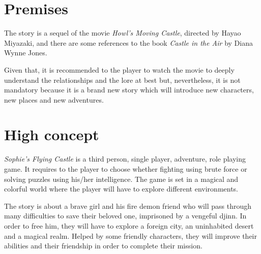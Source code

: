 \section{Premises}

The story is a sequel of the movie \textit{Howl’s Moving Castle}, directed by Hayao Miyazaki, and there are some references to the book \textit{Castle in the Air} by Diana Wynne Jones.

Given that, it is recommended to the player to watch the movie to deeply understand the relationships and the lore at best but, nevertheless, it is not mandatory because it is a brand new story which will introduce new characters, new places and new adventures.

{\let\clearpage\relax\section{High concept}}

\textit{Sophie's Flying Castle} is a third person, single player, adventure, role playing game. It requires to the player to choose whether fighting using brute force or solving puzzles using his/her intelligence. The game is set in a magical and colorful world where the player will have to explore different environments. 

The story is about a brave girl and his fire demon friend who will pass through many difficulties to save their beloved one, imprisoned by a vengeful djinn. In order to free him, they will have to explore a foreign city, an uninhabited desert and a magical realm. Helped by some friendly characters, they will improve their abilities and their friendship in order to complete their mission.

\newpage
